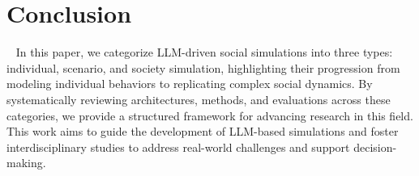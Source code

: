 \section{Conclusion}~\label{sec:con}
In this paper, we categorize LLM-driven social simulations into three types: individual, scenario, and society simulation, highlighting their progression from modeling individual behaviors to replicating complex social dynamics. By systematically reviewing architectures, methods, and evaluations across these categories, we provide a structured framework for advancing research in this field. This work aims to guide the development of LLM-based simulations and foster interdisciplinary studies to address real-world challenges and support decision-making.

